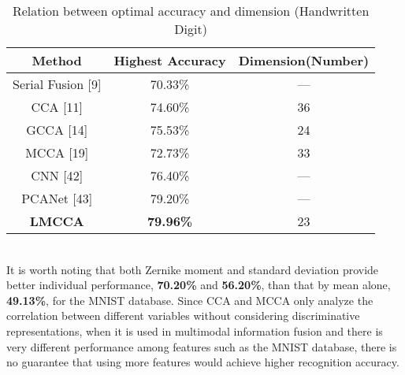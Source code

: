 \documentclass[journal]{IEEEtran}
\begin{document}
\begin{table}[h]
\small
\renewcommand{\arraystretch}{1.4}
\caption{\normalsize{Relation between optimal accuracy and dimension (Handwritten Digit)}}
\setlength{\abovecaptionskip}{0pt}
\setlength{\belowcaptionskip}{10pt}
\centering
\tabcolsep 0.07in
\begin{tabular}{ccc}
\hline
Method & Highest Accuracy & Dimension(Number)\\
\hline
Serial Fusion [9] &70.33\% & ---\\
CCA [11] &74.60\% & 36\\
GCCA [14] &75.53\% & 24\\
MCCA [19] &72.73\% & 33\\
CNN [42] &76.40\% & ---\\
PCANet [43] &79.20\% & ---\\
\textbf{LMCCA} &\textbf{79.96\%} & 23\\
\hline
\end{tabular}
\end{table}\\\indent
It is worth noting that both Zernike moment and standard deviation provide better individual performance, \textbf{70.20\%} and \textbf{56.20\%}, than that by mean alone, \textbf{49.13\%}, for the MNIST database. Since CCA and MCCA only analyze the correlation between different variables without considering discriminative representations, when it is used in multimodal information fusion and there is very different performance among features such as the MNIST database, there is no guarantee that using more features would achieve higher recognition accuracy.
\end{document}
